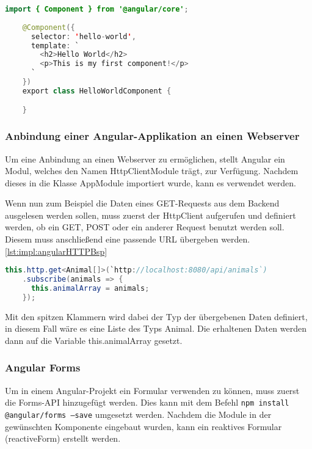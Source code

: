 \begin{lstlisting}[language=java,caption=Beispiel für eine minimierte Angular Komponente,label=lst:impl:angularBsp]
    import { Component } from '@angular/core';
 
    @Component({
      selector: 'hello-world',
      template: `
        <h2>Hello World</h2>
        <p>This is my first component!</p>
      `
    })
    export class HelloWorldComponent {

    }
\end{lstlisting}
\cite{angularOfficialSite}
 
\subsubsection{Anbindung einer Angular-Applikation an einen Webserver}
Um eine Anbindung an einen Webserver zu ermöglichen, stellt Angular ein Modul, welches den Namen HttpClientModule trägt, zur Verfügung. Nachdem dieses in die Klasse AppModule importiert wurde, kann es verwendet werden.
 
Wenn nun zum Beispiel die Daten eines GET-Requests aus dem Backend ausgelesen werden sollen, muss zuerst der HttpClient aufgerufen und definiert werden, ob ein GET, POST oder ein anderer Request benutzt werden soll. Diesem muss anschließend eine passende URL übergeben werden. \ref{lst:impl:angularHTTPBsp}
 
\begin{lstlisting}[language=java,caption=Beispiel für einen GET-Request,label=lst:impl:angularHTTPBsp]
  this.http.get<Animal[]>(`http://localhost:8080/api/animals`)
    .subscribe(animals => {
      this.animalArray = animals;
    });
\end{lstlisting}
 
Mit den spitzen Klammern wird dabei der Typ der übergebenen Daten definiert, in diesem Fall wäre es eine Liste des Typs Animal. Die erhaltenen Daten werden dann auf die Variable this.animalArray gesetzt. \cite{angularHandbuchBuch}
 
\subsubsection{Angular Forms}
Um in einem Angular-Projekt ein Formular verwenden zu können, muss zuerst die Forms-API hinzugefügt werden. Dies kann mit dem Befehl \texttt{npm install @angular/forms --save} umgesetzt werden. Nachdem die Module in der gewünschten Komponente eingebaut wurden, kann ein reaktives Formular (reactiveForm) erstellt werden.
 
